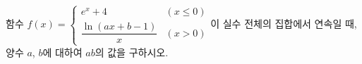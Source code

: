 함수 $f(x)=\begin{cases} e^x+4 & (x\le 0) \\ \dfrac{\ln(ax+b-1)}{x} & (x>0) \end{cases}$이 실수 전체의 집합에서 연속일 때, 양수 $a$, $b$에 대하여 $ab$의 값을 구하시오.
